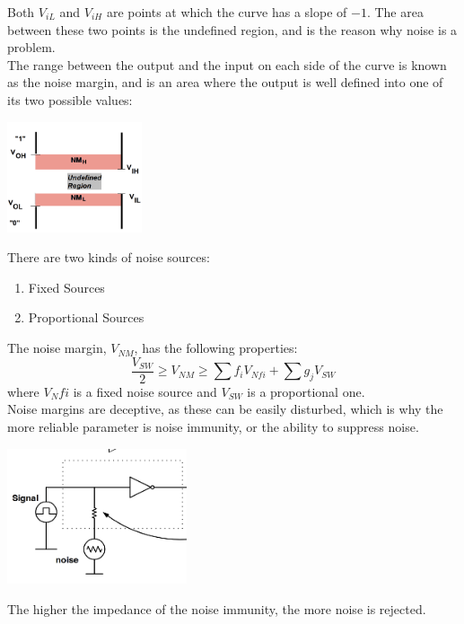 \documentclass[nobib,fleqn,8pt]{article}
\begin{document}
Both $V_{iL}$ and $V_{iH}$ are points at which the curve has a slope of $-1$. The area between these two points is the undefined region, and is the reason why noise is a problem.\\
The range between the output and the input on each side of the curve is known as the noise margin, and is an area where the output is well defined into one of its two possible values:
\begin{center}
    \includegraphics[width = 150px]{images/noise_margin.png}
\end{center}
There are two kinds of noise sources:
\begin{enumerate}
    \item Fixed Sources
    \item Proportional Sources
\end{enumerate}
The noise margin, $V_{NM}$, has the following properties:
\begin{equation*}
    \frac{V_{SW}}{2} \geq V_{NM}\geq \sum f_i V_{Nfi}+ \sum g_j V_{SW}
\end{equation*}
where $V_Nfi$ is a fixed noise source and $V_{SW}$ is a proportional one.\\
Noise margins are deceptive, as these can be easily disturbed, which is why the more reliable parameter is noise immunity, or the ability to suppress noise.
\begin{center}
    \includegraphics*[width = 200px]{images/noise_immunity.png}
\end{center}
The higher the impedance of the noise immunity, the more noise is rejected.\\
\end{document}
